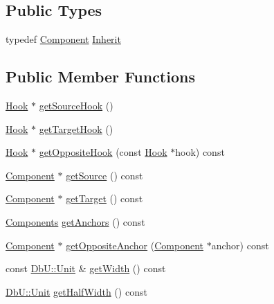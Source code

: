 \subsection*{Public Types}
\begin{DoxyCompactItemize}
\item 
typedef \hyperlink{classHurricane_1_1Component}{Component} \hyperlink{classHurricane_1_1Segment_a2f616ba119bb6e9751659814bdbf0320}{Inherit}
\end{DoxyCompactItemize}
\subsection*{Public Member Functions}
\begin{DoxyCompactItemize}
\item 
\hyperlink{classHurricane_1_1Hook}{Hook} $\ast$ \hyperlink{classHurricane_1_1Segment_aa9d0303b444b44d7b8e47d42ac7151eb}{get\+Source\+Hook} ()
\item 
\hyperlink{classHurricane_1_1Hook}{Hook} $\ast$ \hyperlink{classHurricane_1_1Segment_a0fe6cd20516eca2a0b5639ab886bd831}{get\+Target\+Hook} ()
\item 
\hyperlink{classHurricane_1_1Hook}{Hook} $\ast$ \hyperlink{classHurricane_1_1Segment_afcd8471a2f2cfaa0e8e78a84ff7c09fc}{get\+Opposite\+Hook} (const \hyperlink{classHurricane_1_1Hook}{Hook} $\ast$hook) const
\item 
\hyperlink{classHurricane_1_1Component}{Component} $\ast$ \hyperlink{classHurricane_1_1Segment_aaa8954fc5948f2a881cdbc9213f9f7a9}{get\+Source} () const
\item 
\hyperlink{classHurricane_1_1Component}{Component} $\ast$ \hyperlink{classHurricane_1_1Segment_a1f7f13b33be3b1a20ea23b3f501296e9}{get\+Target} () const
\item 
\hyperlink{namespaceHurricane_a7d26d99aeb5dd6d70d51bd35d2473e72}{Components} \hyperlink{classHurricane_1_1Segment_ac179f0263fee7fc71e03c9cf8c2d4e45}{get\+Anchors} () const
\item 
\hyperlink{classHurricane_1_1Component}{Component} $\ast$ \hyperlink{classHurricane_1_1Segment_aa425757f271df5c58b024b0494c21588}{get\+Opposite\+Anchor} (\hyperlink{classHurricane_1_1Component}{Component} $\ast$anchor) const
\item 
const \hyperlink{group__DbUGroup_ga4fbfa3e8c89347af76c9628ea06c4146}{Db\+U\+::\+Unit} \& \hyperlink{classHurricane_1_1Segment_a36c7ddda39077385bd8747a8c1df726a}{get\+Width} () const
\item 
\hyperlink{group__DbUGroup_ga4fbfa3e8c89347af76c9628ea06c4146}{Db\+U\+::\+Unit} \hyperlink{classHurricane_1_1Segment_a58e4abcf545ad5c89ca2854a2b4471f8}{get\+Half\+Width} () const

\end{DoxyCompactItemize}
